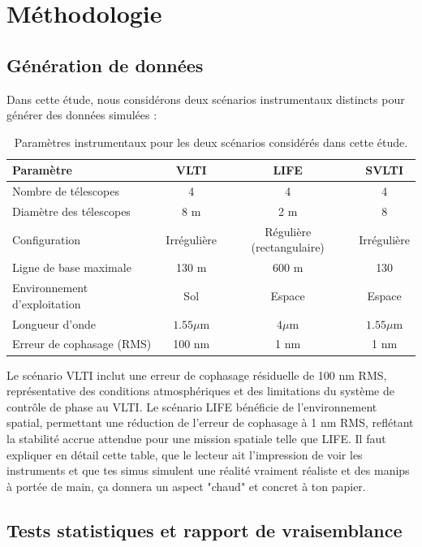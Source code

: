\documentclass{article}
\newcommand{\dm}[1]{{\color{mulberry} #1}}
\begin{document}

\section{Méthodologie}

\subsection{Génération de données}

Dans cette étude, nous considérons deux scénarios instrumentaux distincts pour générer des données simulées :

\begin{table}[H]
\centering
\begin{tabular}{|l|c|c|c|}
\hline
\textbf{Paramètre} & \textbf{VLTI} & \textbf{LIFE} & \textbf{SVLTI} \\
\hline
Nombre de télescopes & 4 & 4 & 4 \\
Diamètre des télescopes & 8 m & 2 m & 8 \\
Configuration & Irrégulière & Régulière (rectangulaire) & Irrégulière \\
Ligne de base maximale & 130 m & 600 m & 130 \\
Environnement d'exploitation & Sol & Espace & Espace \\
Longueur d'onde & $1.55\mu$m & $4\mu$m & $1.55\mu$m \\
Erreur de cophasage (RMS) & 100 nm & 1 nm & 1 nm \\
\hline
\end{tabular}
\caption{Paramètres instrumentaux pour les deux scénarios considérés dans cette étude.}
\label{tab:scenarios}
\end{table}

Le scénario VLTI inclut une erreur de cophasage résiduelle de 100 nm RMS, représentative des conditions atmosphériques et des limitations du système de contrôle de phase au VLTI. Le scénario LIFE bénéficie de l'environnement spatial, permettant une réduction de l'erreur de cophasage à 1 nm RMS, reflétant la stabilité accrue attendue pour une mission spatiale telle que LIFE.\dm{Il faut expliquer en détail cette table, que le lecteur ait l'impression de voir les instruments et que tes simus simulent une réalité vraiment réaliste et des manips à portée de main, ça donnera un aspect "chaud" et concret à ton papier.}

\subsection{Tests statistiques et rapport de vraisemblance}
\end{document}

